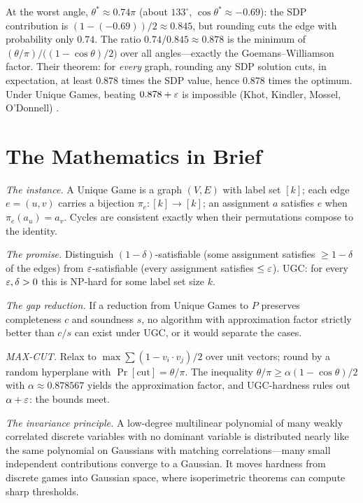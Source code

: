 At the worst angle, $\theta^*\approx0.74\pi$ (about $133^\circ$, $\cos\theta^*\approx-0.69$): the SDP contribution is $(1-(-0.69))/2\approx0.845$, but rounding cuts the edge with probability only $0.74$. The ratio $0.74/0.845\approx0.878$ is the minimum of $(\theta/\pi)\big/\big((1-\cos\theta)/2\big)$ over all angles---exactly the Goemans--Williamson factor. Their theorem: for \emph{every} graph, rounding any SDP solution cuts, in expectation, at least $0.878$ times the SDP value, hence $0.878$ times the optimum. Under Unique Games, beating $0.878+\varepsilon$ is impossible (Khot, Kindler, Mossel, O'Donnell) \cite{goemans-williamson,khot-hardness}.

\section{The Mathematics in Brief}
\emph{The instance.} A Unique Game is a graph $(V,E)$ with label set $[k]$; each edge $e=(u,v)$ carries a bijection $\pi_e:[k]\to[k]$; an assignment $a$ satisfies $e$ when $\pi_e(a_u)=a_v$. Cycles are consistent exactly when their permutations compose to the identity.

\emph{The promise.} Distinguish $(1-\delta)$-satisfiable (some assignment satisfies $\ge1-\delta$ of the edges) from $\varepsilon$-satisfiable (every assignment satisfies $\le\varepsilon$). UGC: for every $\varepsilon,\delta>0$ this is NP-hard for some label set size $k$.

\emph{The gap reduction.} If a reduction from Unique Games to $P$ preserves completeness $c$ and soundness $s$, no algorithm with approximation factor strictly better than $c/s$ can exist under UGC, or it would separate the cases.

\emph{MAX-CUT.} Relax to $\max\sum(1-v_i\cdot v_j)/2$ over unit vectors; round by a random hyperplane with $\Pr[\text{cut}]=\theta/\pi$. The inequality $\theta/\pi\ge\alpha(1-\cos\theta)/2$ with $\alpha\approx0.878567$ yields the approximation factor, and UGC-hardness rules out $\alpha+\varepsilon$: the bounds meet.

\emph{The invariance principle.} A low-degree multilinear polynomial of many weakly correlated discrete variables with no dominant variable is distributed nearly like the same polynomial on Gaussians with matching correlations---many small independent contributions converge to a Gaussian. It moves hardness from discrete games into Gaussian space, where isoperimetric theorems can compute sharp thresholds.


